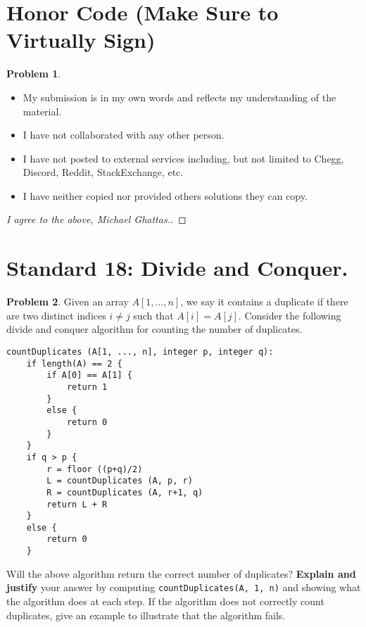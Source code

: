 \documentclass[11pt]{article}
\theoremstyle{definition}
\theoremstyle{definition}
\newtheorem{required}{Problem}
\theoremstyle{definition}
\begin{document}
\section{Honor Code (Make Sure to Virtually Sign)} \label{HonorCode}

\begin{required}
\noindent 
\begin{itemize}
\item My submission is in my own words and reflects my understanding of the material.
\item I have not collaborated with any other person.
\item I have not posted to external services including, but not limited to Chegg, Discord, Reddit, StackExchange, etc.
\item I have neither copied nor provided others solutions they can copy.
\end{itemize}

\end{required}

\begin{proof}[I agree to the above, Michael Ghattas.]
\end{proof}


\newpage
\section{Standard 18: Divide and Conquer.}

\begin{required}
Given an array $A[1, ..., n]$, we say it contains a duplicate if there are two distinct indices $i \neq j$ such that $A[i]=A[j]$. Consider the following divide and conquer algorithm for counting the number of duplicates.

\begin{verbatim}
countDuplicates (A[1, ..., n], integer p, integer q): 
    if length(A) == 2 {
        if A[0] == A[1] {
            return 1
        }
        else {
            return 0
        }
    }
    if q > p {
        r = floor ((p+q)/2)
        L = countDuplicates (A, p, r)
        R = countDuplicates (A, r+1, q)
        return L + R
    }
    else {
        return 0
    }
\end{verbatim}

\noindent Will the above algorithm return the correct number of duplicates? \textbf{Explain and justify} your answer by computing \texttt{countDuplicates(A, 1, n)} and showing what the algorithm does at each step. If the algorithm does not correctly count duplicates, give an example to illustrate that the algorithm fails.
\end{required}
\end{document}
